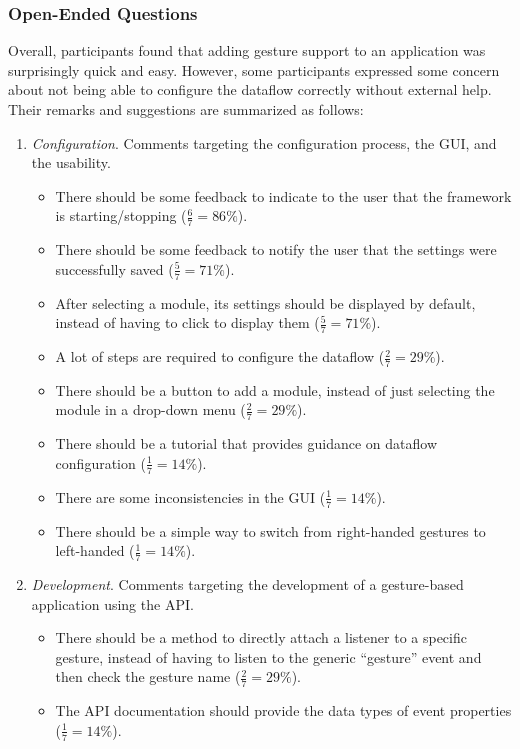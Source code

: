 \subsubsection{Open-Ended Questions}
Overall, participants found that adding gesture support to an application was surprisingly quick and easy. However, some participants expressed some concern about not being able to configure the dataflow correctly without external help. Their remarks and suggestions are summarized as follows:
\begin{enumerate}[noitemsep]
    \item \textit{Configuration}. Comments targeting the configuration process, the GUI, and the usability.
    \begin{itemize}[noitemsep]
        \item There should be some feedback to indicate to the user that the framework is starting/stopping ($\frac{6}{7}{=}86\%$). 
        \item There should be some feedback to notify the user that the settings were successfully saved ($\frac{5}{7}{=}71\%$).
        \item After selecting a module, its settings should be displayed by default, instead of having to click to display them ($\frac{5}{7}{=}71\%$).
        \item A lot of steps are required to configure the dataflow ($\frac{2}{7}{=}29\%$).
        \item There should be a button to add a module, instead of just selecting the module in a drop-down menu ($\frac{2}{7}{=}29\%$).
        \item There should be a tutorial that provides guidance on dataflow configuration ($\frac{1}{7}{=}14\%$).
        \item There are some inconsistencies in the GUI ($\frac{1}{7}{=}14\%$).
        \item There should be a simple way to switch from right-handed gestures to left-handed ($\frac{1}{7}{=}14\%$).
    \end{itemize}
    \item \textit{Development}. Comments targeting the development of a gesture-based application using the \ql API.
    \begin{itemize}[noitemsep]
        \item There should be a method to directly attach a listener to a specific gesture, instead of having to listen to the generic ``gesture'' event and then check the gesture name ($\frac{2}{7}{=}29\%$).
        \item The API documentation should provide the data types of event properties ($\frac{1}{7}{=}14\%$).

\end{itemize}
\end{enumerate}
